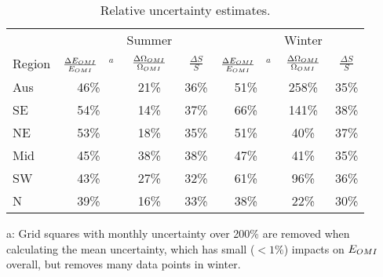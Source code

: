   \begin{table}\begin{threeparttable}
      \caption{Relative uncertainty estimates.}
      \begin{tabular}{ l | c  c  c | c c c} 
        \toprule
        & & Summer & & & Winter & \\
        Region & $\frac{\Delta E_{OMI}}{E_{OMI}}$ ~$^a$ & $\frac{\Delta \Omega_{OMI}}{\Omega_{OMI}}$ & $\frac{\Delta S}{S}$ 
          & $\frac{\Delta E_{OMI}}{E_{OMI}}$ ~$^a$ & $\frac{\Delta \Omega_{OMI}}{\Omega_{OMI}}$ & $\frac{\Delta S}{S}$ \\
        \midrule
          Aus &   46\% &   21\% &   36\% &   51\% &  258\% &   35\% \\
          SE &   54\% &   14\% &   37\% &   66\% &  141\% &   38\% \\
          NE &   53\% &   18\% &   35\% &   51\% &   40\% &   37\% \\
          Mid &   45\% &   38\% &   38\% &   47\% &   41\% &   35\% \\
          SW &   43\% &   27\% &   32\% &   61\% &   96\% &   36\% \\
          N &   39\% &   16\% &   33\% &   38\% &   22\% &   30\% \\
        \bottomrule
      \end{tabular}
      \begin{tablenotes} 
        \item a: Grid squares with monthly uncertainty over 200\% are removed when calculating the mean uncertainty, which has small ($<1\%$) impacts on $E_{OMI}$ overall, but removes many data points in winter. 
      \end{tablenotes}
      \label{BioIsop:uncertainty:tab_uncertainties}
    \end{threeparttable}\end{table}
    

%    
    
